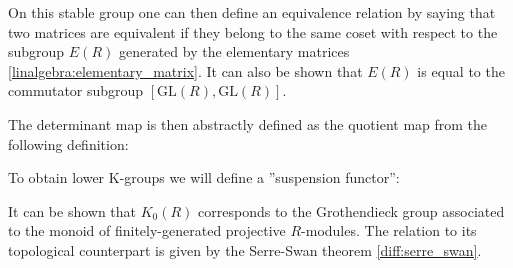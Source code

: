     On this stable group one can then define an equivalence relation by saying that two matrices are equivalent if they belong to the same coset with respect to the subgroup $E(R)$ generated by the elementary matrices \ref{linalgebra:elementary_matrix}. It can also be shown that $E(R)$ is equal to the commutator subgroup $[\text{GL}(R), \text{GL}(R)]$.

    The determinant map is then abstractly defined as the quotient map from the following definition:

    To obtain lower K-groups we will define a ''suspension functor'':

    \begin{example}[$K_0$]
        It can be shown that $K_0(R)$ corresponds to the Grothendieck group associated to the monoid of finitely-generated projective $R$-modules. The relation to its topological counterpart is given by the Serre-Swan theorem \ref{diff:serre_swan}.
    \end{example}